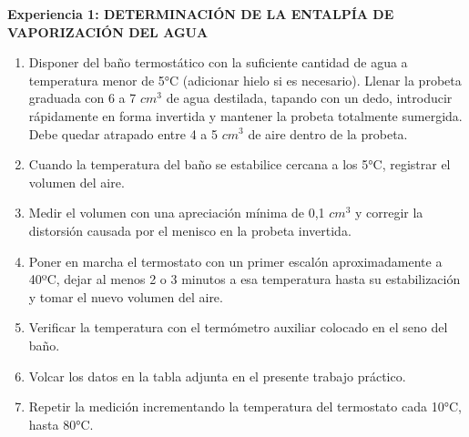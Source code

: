 \documentclass[10pt,a4paper]{article}
\begin{document}
\textbf{Experiencia 1: DETERMINACIÓN DE LA ENTALPÍA DE VAPORIZACIÓN DEL AGUA}  \\
 \begin{enumerate}
 \item Disponer del baño termostático con la suficiente cantidad de agua a temperatura menor de 5°C (adicionar hielo si es necesario). Llenar la probeta graduada con 6 a 7 $cm^{3}$  de agua destilada, tapando con un dedo, introducir rápidamente en forma invertida y mantener la probeta totalmente sumergida. Debe quedar atrapado entre 4 a 5 $cm^{3}$  de aire dentro de la probeta. \\
 \item Cuando la temperatura del baño se estabilice cercana a los 5°C, registrar el volumen del aire. \\
 \item Medir el volumen con una apreciación mínima de 0,1 $cm^{3}$  y corregir la distorsión causada por el menisco en la probeta invertida. \\
 \item Poner en marcha el termostato con un primer escalón aproximadamente a 40ºC, dejar al menos 2 o 3 minutos a esa temperatura hasta su estabilización y tomar el nuevo volumen del aire. \\
 \item Verificar la temperatura con el termómetro auxiliar colocado en el seno del baño. \\
 \item Volcar los datos en la tabla adjunta en el presente trabajo práctico. \\
 \item Repetir la medición incrementando la temperatura del termostato cada 10°C, hasta 80°C. \\
 \end{enumerate}
	
 
	
 
	
 
	
 

 
	
 
	
\end{document}
